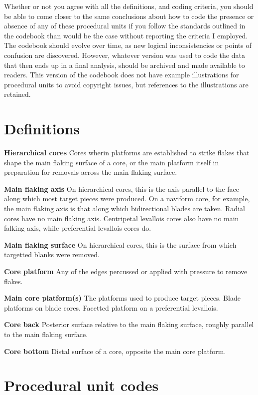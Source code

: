 \documentclass[
]{article}
\begin{document}
Whether or not you agree with all the definitions, and coding criteria,
you should be able to come closer to the same conclusions about how to
code the presence or absence of any of these procedural units if you
follow the standards outlined in the codebook than would be the case
without reporting the criteria I employed. The codebook should evolve
over time, as new logical inconsistencies or points of confusion are
discovered. However, whatever version was used to code the data that
then ends up in a final analysis, should be archived and made available
to readers. This version of the codebook does not have example
illustrations for procedural units to avoid copyright issues, but
references to the illustrations are retained.

\hypertarget{definitions}{%
\section{Definitions}\label{definitions}}

\textbf{Hierarchical cores} Cores wherin platforms are established to
strike flakes that shape the main flaking surface of a core, or the main
platform itself in preparation for removals across the main flaking
surface.

\textbf{Main flaking axis} On hierarchical cores, this is the axis
parallel to the face along which most target pieces were produced. On a
naviform core, for example, the main flaking axis is that along which
bidirectional blades are taken. Radial cores have no main flaking axis.
Centripetal levallois cores also have no main falking axis, while
preferential levallois cores do.

\textbf{Main flaking surface} On hierarchical cores, this is the surface
from which targetted blanks were removed.

\textbf{Core platform} Any of the edges percussed or applied with
pressure to remove flakes.

\textbf{Main core platform(s)} The platforms used to produce target
pieces. Blade platforms on blade cores. Facetted platform on a
preferential levallois.

\textbf{Core back} Posterior surface relative to the main flaking
surface, roughly parallel to the main flaking surface.

\textbf{Core bottom} Distal surface of a core, opposite the main core
platform.

\hypertarget{procedural-unit-codes}{%
\section{Procedural unit codes}\label{procedural-unit-codes}}
\end{document}
